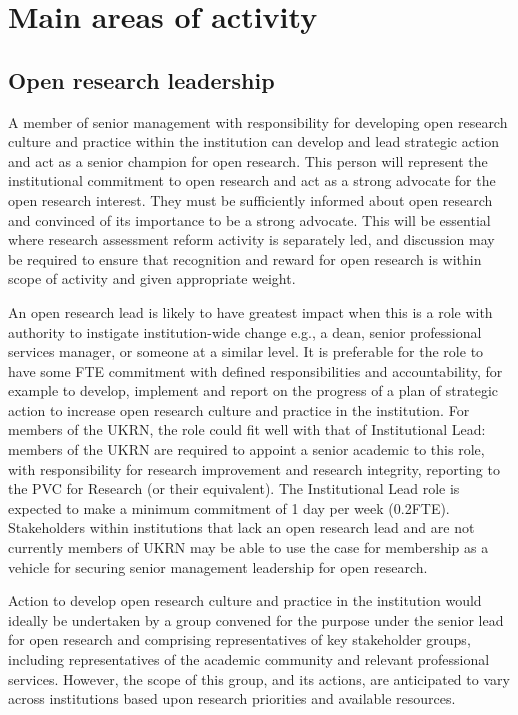 \documentclass[
  letterpaper,
  DIV=11,
  numbers=noendperiod,
  oneside]{scrreprt}
\begin{document}
\section{Main areas of activity}\label{main-areas-of-activity-1}

\subsection{Open research leadership}\label{open-research-leadership}

A member of senior management with responsibility for developing open
research culture and practice within the institution can develop and
lead strategic action and act as a senior champion for open research.
This person will represent the institutional commitment to open research
and act as a strong advocate for the open research interest. They must
be sufficiently informed about open research and convinced of its
importance to be a strong advocate. This will be essential where
research assessment reform activity is separately led, and discussion
may be required to ensure that recognition and reward for open research
is within scope of activity and given appropriate weight.

An open research lead is likely to have greatest impact when this is a
role with authority to instigate institution-wide change e.g., a dean,
senior professional services manager, or someone at a similar level. It
is preferable for the role to have some FTE commitment with defined
responsibilities and accountability, for example to develop, implement
and report on the progress of a plan of strategic action to increase
open research culture and practice in the institution. For members of
the UKRN, the role could fit well with that of Institutional Lead:
members of the UKRN are required to appoint a senior academic to this
role, with responsibility for research improvement and research
integrity, reporting to the PVC for Research (or their equivalent). The
Institutional Lead role is expected to make a minimum commitment of 1
day per week (0.2FTE). Stakeholders within institutions that lack an
open research lead and are not currently members of UKRN may be able to
use the case for membership as a vehicle for securing senior management
leadership for open research.

Action to develop open research culture and practice in the institution
would ideally be undertaken by a group convened for the purpose under
the senior lead for open research and comprising representatives of key
stakeholder groups, including representatives of the academic community
and relevant professional services. However, the scope of this group,
and its actions, are anticipated to vary across institutions based upon
research priorities and available resources.
\end{document}
